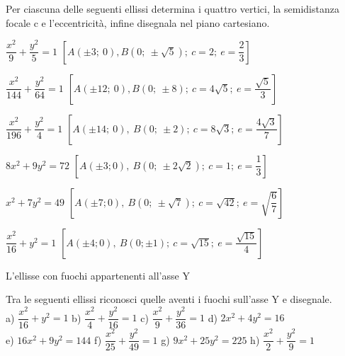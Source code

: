 % 
\begin{esercizio}
  \label{ese:div.003}
  Per ciascuna delle seguenti ellissi determina i quattro vertici, la 
semidistanza focale c e l'eccentricità, infine disegnala nel piano 
cartesiano.
  \begin{enumeratea}
\item \( \dfrac{x^{2}}{9} + \dfrac{y^{2}}{5} =1\)  
\hfill \(\left[A(\pm3;~0), B\left(0; ~ \pm  \sqrt{5} \right); ~c=2 ;~ e= 
\dfrac{2}{3} \right]\)
\item \( \dfrac{x^{2}}{144} + \dfrac{y^{2}}{64} =1\)  
\hfill \(\left[A(\pm12;~ 0), B(0; ~ \pm 8); ~c=4 \sqrt{5}  ;~ e= 
\dfrac{\sqrt{5}}{3} \right]\)

\item \( \dfrac{x^{2}}{196} + \dfrac{y^{2}}{4} =1\)
\hfill \(\left[A(\pm14;~ 0),~ B(0; ~ \pm 2);~ c=8 \sqrt{3}  ;~ e= 
\dfrac{4\sqrt{3}}{7} \right]\)

\item \(8{x^{2}}+9{y^{2}}=72\)
\hfill  \(\left[A(\pm3; 0),~ B\left(0;~ \pm 2 \sqrt{2} \right);~c=1; ~e= 
\dfrac{1}{3} \right]\)

\item \({x^{2}}+7{y^{2}}=49\)
\hfill \(\left[A(\pm7; 0),~ B\left(0; ~ \pm  \sqrt{7} \right);~ c= \sqrt{42} 
;~ e= \sqrt{\dfrac{6}{7}} \right]\)

\item \( \dfrac{x^{2}}{16} + y^{2} =1\)  
\hfill \(\left[A(\pm4; 0),~ B(0;  \pm 1);~ c= \sqrt{15}  ;~ e= 
\dfrac{\sqrt{15}}{4} \right]\)

  \end{enumeratea}
\end{esercizio}
L'ellisse con fuochi appartenenti all'asse Y
\begin{esercizio}
  \label{ese:div.003}
   Tra le seguenti ellissi riconosci quelle aventi i fuochi sull'asse 
Y e disegnale. \\
a) \( \dfrac{x^{2}}{16} + y^{2} =1\)  \hspace{1.5cm} b) \( \dfrac{x^{2}}{4} + 
\dfrac{y^{2}}{16} =1\)\hspace{1.5cm}  c) \( \dfrac{x^{2}}{9} + 
\dfrac{y^{2}}{36} =1\)\hspace{1.45cm} d) \(2 x^{2} +4y^{2} =16\)\\
e) \(16 x^{2} +9 y^{2} =144\)  \hspace{0.7cm} f) \( \dfrac{x^{2}}{25} + 
\dfrac{y^{2}}{49} =1\)\hspace{1.6cm}  g) \(9 x^{2} +25 y^{2} =225\) 
\hspace{0.6cm} h) \( \dfrac{x^{2}}{2} + \dfrac{y^{2}}{9} =1\) 
\end{esercizio}
